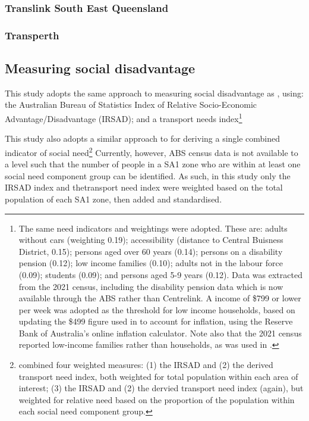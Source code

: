 \documentclass[preprint, 3p,
authoryear]{elsarticle} %
\begin{document}
\subsubsection{Translink South East
Queensland}\label{translink-south-east-queensland}

\subsubsection{Transperth}\label{transperth}

\subsection{Measuring social
disadvantage}\label{measuring-social-disadvantage}

This study adopts the same approach to measuring social disadvantage as
\citet{currie2010identifying}, using: the Australian Bureau of
Statistics Index of Relative Socio-Economic Advantage/Disadvantage
(IRSAD); and a transport needs index\footnote{The same need indicators
  and weightings were adopted. These are: adults without cars (weighting
  0.19); accessibility (distance to Central Buisness District, 0.15);
  persons aged over 60 years (0.14); persons on a disability pension
  (0.12); low income families (0.10); adults not in the labour force
  (0.09); students (0.09); and persons aged 5-9 years (0.12). Data was
  extracted from the 2021 census, including the disability pension data
  which is now available through the ABS rather than Centrelink. A
  income of \$799 or lower per week was adopted as the threshold for low
  income households, based on updating the \$499 figure used in
  \citet{currie2010identifying} to account for inflation, using the
  Reserve Bank of Australia's online inflation calculator. Note also
  that the 2021 census reported low-income families rather than
  households, as was used in \citet{currie2010identifying}.}

This study also adopts a similar approach to
\citet{currie2010identifying} for deriving a single combined indicator
of social need\footnote{\citet{currie2010identifying} combined four
  weighted measures: (1) the IRSAD and (2) the derived transport need
  index, both weighted for total population within each area of
  interest; (3) the IRSAD and (2) the dervied transport need index
  (again), but weighted for relative need based on the proportion of the
  population within each social need component group.} Currently,
however, ABS census data is not available to a level such that the
number of people in a SA1 zone who are within at least one social need
component group can be identified. As such, in this study only the IRSAD
index and thetransport need index were weighted based on the total
population of each SA1 zone, then added and standardised.
\end{document}
